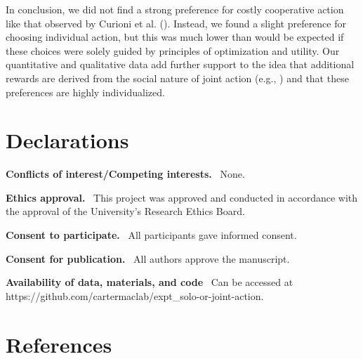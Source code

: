 \documentclass[
  man,
  floatsintext,
  longtable,
  nolmodern,
  notxfonts,
  notimes,
  mask,
  colorlinks=true,linkcolor=blue,citecolor=blue,urlcolor=blue]{apa7}
\begin{document}
In conclusion, we did not find a strong preference for costly
cooperative action like that observed by Curioni et al.
(). Instead, we found a slight
preference for choosing individual action, but this was much lower than
would be expected if these choices were solely guided by principles of
optimization and utility. Our quantitative and qualitative data add
further support to the idea that additional rewards are derived from the
social nature of joint action (e.g., ) and that these preferences are highly individualized.

\vfill

\section{Declarations}\label{declarations}

\noindent \textbf{Conflicts of interest/Competing interests.} ~None.

\noindent \textbf{Ethics approval.} ~This project was approved and
conducted in accordance with the approval of the University's Research
Ethics Board.

\noindent \textbf{Consent to participate.} ~All participants gave
informed consent.

\noindent \textbf{Consent for publication.} ~All authors approve the
manuscript.

\noindent \textbf{Availability of data, materials, and code} ~Can be
accessed at https://github.com/cartermaclab/expt\_solo-or-joint-action.

\newpage

\section{References}\label{references}
\end{document}
